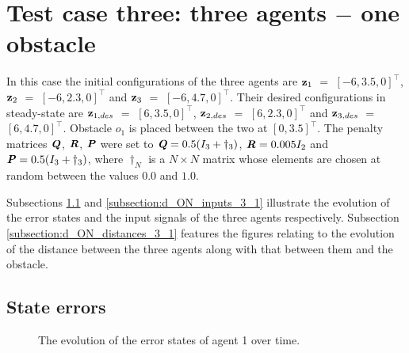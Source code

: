\section{Test case three: three agents $-$ one obstacle}

In this case the initial configurations of the three agents are
$\bm{\mathbf{z}}_1$ $=$ $[-6, 3.5, 0]^{\top}$,
$\bm{\mathbf{z}}_2$ $=$ $[-6, 2.3, 0]^{\top}$ and
$\bm{\mathbf{z}}_3$ $=$ $[-6, 4.7, 0]^{\top}$.
Their desired configurations in steady-state are
$\bm{\mathbf{z}}_{1,des}$ $=$ $[6, 3.5, 0]^{\top}$,
$\bm{\mathbf{z}}_{2,des}$ $=$ $[6, 2.3, 0]^{\top}$ and
$\bm{\mathbf{z}}_{3,des}$ $=$ $[6, 4.7, 0]^{\top}$.
Obstacle $o_1$ is placed between the two at $[0, 3.5]^{\top}$. The penalty
matrices $\bm{\mathit{Q}}$, $\bm{\mathit{R}}$, $\bm{\mathit{P}}$ were set to
$\bm{\mathit{Q}} = 0.5 (I_3 + \dagger_3)$, $\bm{\mathit{R}} = 0.005 I_2$ and
$\bm{\mathit{P}} = 0.5 (I_3 + \dagger_3)$, where $\dagger_N$ is a $N \times N$ matrix
whose elements are chosen at random between the values $0.0$ and $1.0$.

Subsections \ref{subsection:d_ON_errors_3_1} and
\ref{subsection:d_ON_inputs_3_1} illustrate the evolution of the error states
and the input signals of the three agents respectively. Subsection
\ref{subsection:d_ON_distances_3_1} features the figures relating to the
evolution of the distance between the three agents along with that between
them and the obstacle.

\subsection{State errors}
\label{subsection:d_ON_errors_3_1}

\begin{figure}[H]\centering
  \scalebox{0.7}{}
  \caption{The evolution of the error states of agent 1 over time.}
  \label{fig:d_ON_3_1_errors_agent_1}
\end{figure}

\noindent{}



